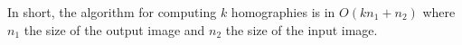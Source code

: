 In short, the algorithm for computing $k$ homographies is in $O(k n_1 + n_2)$ where $n_1$ the size of the output image and $n_2$ the size of the input image.










